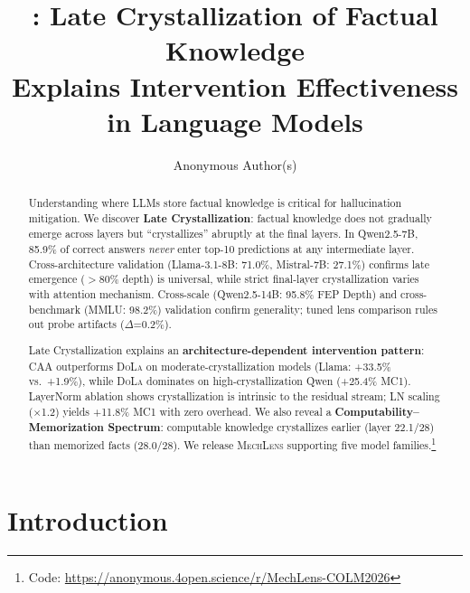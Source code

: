 \documentclass{article}
\title{\mechlens{}: Late Crystallization of Factual Knowledge \\
Explains Intervention Effectiveness in Language Models}
\author{
  Anonymous Author(s)
}
\newcommand{\mechlens}{\textsc{MechLens}}
\newcommand{\dola}{\textsc{DoLa}}
\newcommand{\caa}{\textsc{CAA}}
\begin{document}
\ifcolmsubmission
\linenumbers
\fi

\maketitle

\begin{abstract}
Understanding where LLMs store factual knowledge is critical for hallucination mitigation. We discover \textbf{Late Crystallization}: factual knowledge does not gradually emerge across layers but ``crystallizes'' abruptly at the final layers. In Qwen2.5-7B, 85.9\% of correct answers \emph{never} enter top-10 predictions at any intermediate layer. Cross-architecture validation (Llama-3.1-8B: 71.0\%, Mistral-7B: 27.1\%) confirms late emergence ($>$80\% depth) is universal, while strict final-layer crystallization varies with attention mechanism. Cross-scale (Qwen2.5-14B: 95.8\% FEP Depth) and cross-benchmark (MMLU: 98.2\%) validation confirm generality; tuned lens comparison rules out probe artifacts ($\Delta$=0.2\%).

Late Crystallization explains an \textbf{architecture-dependent intervention pattern}: \caa{} outperforms \dola{} on moderate-crystallization models (Llama: +33.5\% vs.\ +1.9\%), while \dola{} dominates on high-crystallization Qwen (+25.4\% MC1). LayerNorm ablation shows crystallization is intrinsic to the residual stream; LN scaling ($\times$1.2) yields +11.8\% MC1 with zero overhead. We also reveal a \textbf{Computability--Memorization Spectrum}: computable knowledge crystallizes earlier (layer 22.1/28) than memorized facts (28.0/28). We release \mechlens{} supporting five model families.\footnote{Code: \url{https://anonymous.4open.science/r/MechLens-COLM2026}}
\end{abstract}

\section{Introduction}
\label{sec:introduction}
\end{document}
